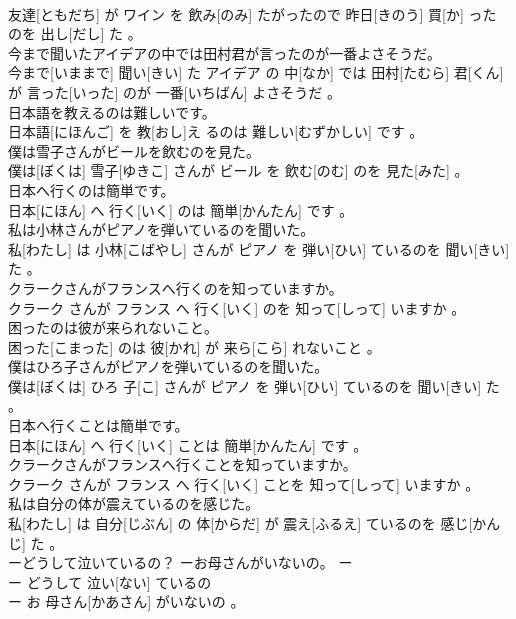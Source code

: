 \documentclass[8pt]{extreport}
\begin{document}
\begin{CJK}{UTF8}{min}
\\	友達[ともだち] が ワイン を 飲み[のみ] たがったので 昨日[きのう] 買[か] った のを 出し[だし] た 。
\\	今まで聞いたアイデアの中では田村君が言ったのが一番よさそうだ。	
\\	今まで[いままで] 聞い[きい] た アイデア の 中[なか] では 田村[たむら] 君[くん] が 言った[いった] のが 一番[いちばん] よさそうだ 。
\\	日本語を教えるのは難しいです。	
\\	日本語[にほんご] を 教[おし]え るのは 難しい[むずかしい] です 。
\\	僕は雪子さんがビールを飲むのを見た。	
\\	僕は[ぼくは] 雪子[ゆきこ] さんが ビール を 飲む[のむ] のを 見た[みた] 。
\\	日本へ行くのは簡単です。	
\\	日本[にほん] へ 行く[いく] のは 簡単[かんたん] です 。
\\	私は小林さんがピアノを弾いているのを聞いた。	
\\	私[わたし] は 小林[こばやし] さんが ピアノ を 弾い[ひい] ているのを 聞い[きい] た 。
\\	クラークさんがフランスへ行くのを知っていますか。	
\\	クラーク さんが フランス へ 行く[いく] のを 知って[しって] いますか 。
\\	困ったのは彼が来られないこと。	
\\	困った[こまった] のは 彼[かれ] が 来ら[こら] れないこと 。
\\	僕はひろ子さんがピアノを弾いているのを聞いた。	
\\	僕は[ぼくは] ひろ 子[こ] さんが ピアノ を 弾い[ひい] ているのを 聞い[きい] た 。
\\	日本へ行くことは簡単です。	
\\	日本[にほん] へ 行く[いく] ことは 簡単[かんたん] です 。
\\	クラークさんがフランスへ行くことを知っていますか。	
\\	クラーク さんが フランス へ 行く[いく] ことを 知って[しって] いますか 。
\\	私は自分の体が震えているのを感じた。	
\\	私[わたし] は 自分[じぶん] の 体[からだ] が 震え[ふるえ] ているのを 感じ[かんじ] た 。
\\	ーどうして泣いているの？ ーお母さんがいないの。	ー
\\	ー どうして 泣い[ない] ているの 
\\	ー お 母さん[かあさん] がいないの 。

\end{CJK}
\end{document}
